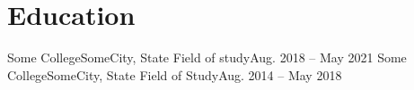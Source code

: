 \documentclass[../main.tex]{subfiles}
\begin{document}
    
    \section{Education}
    \resumeSubHeadingListStart
        \resumeSubheading
        {Some College}{SomeCity, State}
        {Field of study}{Aug. 2018 -- May 2021}
        \resumeSubheading
        {Some College}{SomeCity, State}
        {Field of Study}{Aug. 2014 -- May 2018}
    \resumeSubHeadingListEnd
\end{document}
